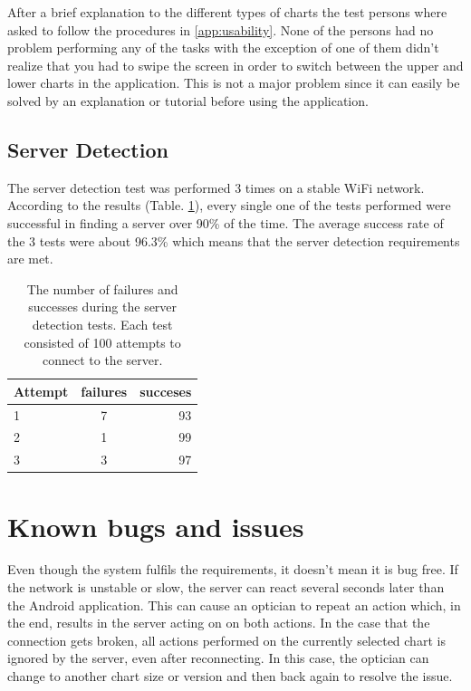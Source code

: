\documentclass[12pt,a4paper,notitlepage]{report}
\begin{document}
After a brief explanation to the different types of charts the test persons where asked to follow the procedures in \ref{app:usability}. None of the persons had no problem performing any of the tasks with the exception of one of them didn't realize that you had to swipe the screen in order to switch between the upper and lower charts in the application. This is not a major problem since it can easily be solved by an explanation or tutorial before using the application.



\subsection{Server Detection}
The server detection test was performed 3 times on a stable WiFi network. According to the results (Table. \ref{tab:server_detection_test}), every single one of the tests performed were successful in finding a server over 90\% of the time. The average success rate of the 3 tests were about 96.3\% which means that the server detection requirements are met.

\begin{table}[ht!]
\centering
\begin{tabular}{l c r}
Attempt	&	failures	&	succeses	\\
\hline
1	&	7	&	93	\\
2	&	1	&	99	\\
3	&	3	&	97	\\
\end{tabular}
\caption{The number of failures and successes during the server detection tests. Each test consisted of 100 attempts to connect to the server. \label{tab:server_detection_test}}
\end{table}


\section{Known bugs and issues}
Even though the system fulfils the requirements, it doesn't mean it is bug free. If the network is unstable or slow, the server can react several seconds later than the Android application. This can cause an optician to repeat an action which, in the end, results in the server acting on on both actions. In the case that the connection gets broken, all actions performed on the currently selected chart is ignored by the server, even after reconnecting. In this case, the optician can change to another chart size or version and then back again to resolve the issue.
\end{document}
